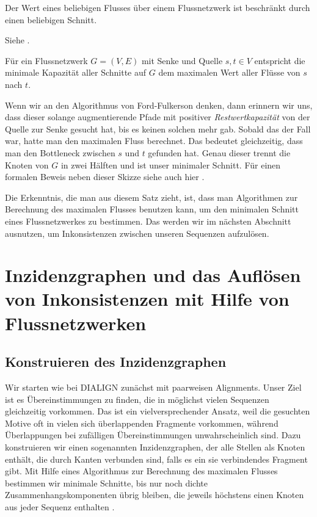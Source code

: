 \begin{lemma}
	Der Wert eines beliebigen Flusses über einem Flussnetzwerk ist beschränkt durch einen beliebigen Schnitt.
\end{lemma}

\begin{beweis}
	Siehe \cite[S.723]{clrs09}.
\end{beweis}

\begin{satz}
	Für ein Flussnetzwerk $G = (V,E)$ mit Senke und Quelle $s, t \in V$ entspricht die minimale Kapazität aller Schnitte auf $G$ dem maximalen Wert aller Flüsse von $s$ nach $t$. 
\end{satz} 

\begin{beweis}
	Wenn wir an den Algorithmus von Ford-Fulkerson denken, dann erinnern wir uns, dass dieser solange augmentierende Pfade mit positiver \emph{Restwertkapazität} von der Quelle zur Senke gesucht hat, bis es keinen solchen mehr gab. Sobald das der Fall war, hatte man den maximalen Fluss berechnet. Das bedeutet gleichzeitig, dass man den Bottleneck zwischen $s$ und $t$ gefunden hat. Genau dieser trennt die Knoten von $G$ in zwei Hälften und ist unser minimaler Schnitt. Für einen formalen Beweis neben dieser Skizze siehe auch hier \cite[S.723f.]{clrs09}.
\end{beweis} 

Die Erkenntnis, die man aus diesem Satz zieht, ist, dass man Algorithmen zur Berechnung des maximalen Flusses benutzen kann, um den minimalen Schnitt eines Flussnetzwerkes zu bestimmen. Das werden wir im nächsten Abschnitt ausnutzen, um Inkonsistenzen zwischen unseren Sequenzen aufzulösen.

\section{Inzidenzgraphen und das Auflösen von Inkonsistenzen mit Hilfe von Flussnetzwerken}

\subsection{Konstruieren des Inzidenzgraphen}

Wir starten wie bei DIALIGN	zunächst mit paarweisen Alignments. Unser Ziel ist es Übereinstimmungen zu finden, die in möglichst vielen Sequenzen gleichzeitig vorkommen. Das ist ein vielversprechender Ansatz, weil die gesuchten Motive oft in vielen sich überlappenden Fragmente vorkommen, während Überlappungen bei zufälligen Übereinstimmungen unwahrscheinlich sind. Dazu konstruieren wir einen sogenannten Inzidenzgraphen, der alle Stellen als Knoten enthält, die durch Kanten verbunden sind, falls es ein sie verbindendes Fragment gibt. Mit Hilfe eines Algorithmus zur Berechnung des maximalen Flusses bestimmen wir minimale Schnitte, bis nur noch dichte Zusammenhangskomponenten übrig bleiben, die jeweils höchstens einen Knoten aus jeder Sequenz enthalten \cite{cpm10}.

